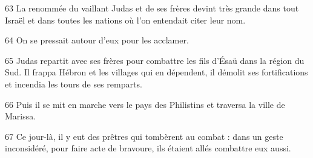 
63 La renommée du vaillant Judas et de ses frères devint très grande dans tout Israël et dans toutes les nations où l’on entendait citer leur nom.

64 On se pressait autour d’eux pour les acclamer.

65 Judas repartit avec ses frères pour combattre les fils d’Ésaü dans la région du Sud. Il frappa Hébron et les villages qui en dépendent, il démolit ses fortifications et incendia les tours de ses remparts.

66 Puis il se mit en marche vers le pays des Philistins et traversa la ville de Marissa.

67 Ce jour-là, il y eut des prêtres qui tombèrent au combat : dans un geste inconsidéré, pour faire acte de bravoure, ils étaient allés combattre eux aussi.